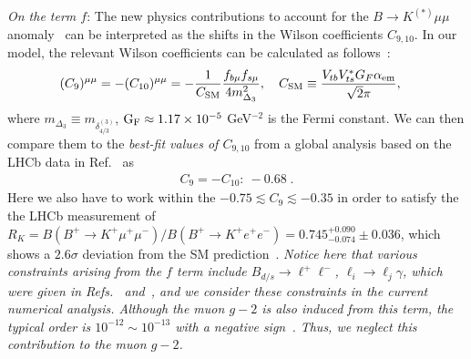 \documentclass[%
showkeys,12pt,
preprint,preprintnumbers,nofootinbib,
groupedaddress,superscriptaddress,amsmath,amssymb]{revtex4}
\numberwithin{equation}{section}
\begin{document}
{\it On the term $f$}:
The new physics contributions to account for the $B\to K^{(*)}\mu\mu$ 
anomaly~\cite{lhcb-2013} can be interpreted as 
the shifts in the Wilson coefficients $C_{9,10}$.
In our model, the relevant Wilson coefficients can be calculated
as follows~\cite{Cheung:2016frv}:
\begin{align}
(C_9)^{\mu \mu}&=-(C_{10} )^{\mu\mu}=-\frac{1}{C_{\rm SM}}
\frac{f_{b\mu} f_{s\mu} }{4 m_{\Delta_3}^2},\quad
C_{\rm SM}\equiv \frac{V_{tb} V^*_{ts} G_F\alpha_{\rm em}}{\sqrt2 \pi},
\end{align}
where $m_{\Delta_3}\equiv m_{\delta_{4/3}^{(3)}}$, ${\rm G_F}\approx1.17\times 10^{-5}$ GeV$^{-2}$ is the Fermi constant.
We can then compare them to 
the {\it best-fit values of $C_{9,10}$} from a global analysis based on the 
LHCb data in 
Ref.~\cite{Descotes-Genon:2015uva} as
\begin{align}
C_{9}=-C_{10}: \ -0.68\; . %
\label{eq:Cp910}
\end{align}%
Here we also have to work within the $ -0.75 \lesssim C_9 \lesssim -0.35$ 
in order to satisfy the  the LHCb measurement of 
$R_K = B(B^+ \to K^+ \mu^+\mu^-)/B(B^+ \to K^+ e^+e^-)=0.745^{+0.090}_{-0.074} 
\pm 0.036$, which shows a $2.6\sigma$ deviation from the SM 
prediction~\cite{Cheung:2016frv}.
{\it Notice here that
various constraints arising from the $f$ term include 
$B_{d/s}\to \ell^+\ell^-$, $\ell_i\to \ell_j\gamma$, which were given in
Refs.~\cite{Cheung:2016frv} and~\cite{Cheung:2016fjo}, and we consider 
these constraints in the current numerical analysis. 
Although the muon $g-2$ is also induced from this term, the typical 
order is $10^{-12}\sim 10^{-13}$ with a negative sign~\cite{Cheung:2016frv}. 
Thus, we neglect this contribution to the muon $g-2$.}
\end{document}
